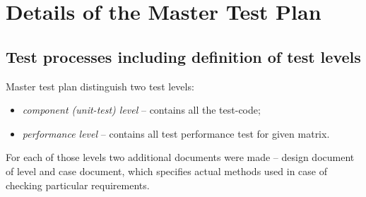 \chapter{Details of the Master Test Plan} \label{chp:details-of-the-master-test-plan}
	\begin{comment}
		$<$Introduce the following subordinate sections. This section describes the test processes, test documentation requirements, and test reporting requirements for the entire test effort. $>$
	\end{comment}
	
\section{Test processes including definition of test levels} \label{s:details-of-the-master-test-plan:test-processes-including-definition-of-test-levels}
	\begin{comment}
		$<$ Identify test activities and tasks to be performed for each of the test processes described in Clause 5 of this standard (or the alternative test processes defined by the user of this standard), and document those test activities and tasks. Provide an overview of the test activities and tasks for all development life cycle processes. Identify the number and sequence of levels of test. There may be a different number of levels than the example used in this standard (component, component integration, system, and acceptance). Integration is often accomplished through a series of test levels, for both component integration and systems integration. Examples of possible additional test levels include security, usability, performance, stress, recovery, and regression. Small systems may have fewer levels of test, e.g., combining system and acceptance. If the test processes are already defined by an organization’s standards, a reference to those standards could be substituted for the contents of this subclause.$>$
	\end{comment}
	Master test plan distinguish two test levels:
	\begin{itemize}
		\item
		{
			\emph{component (unit-test) level} -- contains all the test-code;	
		}
		\item
		{
			\emph{performance level} -- contains all test performance test for given matrix.
		}
	\end{itemize}
	For each of those levels two additional documents were made -- design document of level and case document, which specifies actual methods used in case of checking particular requirements.

